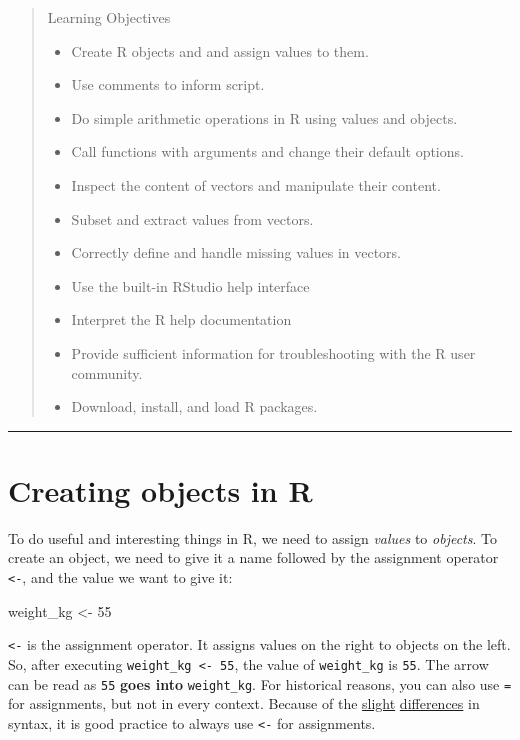 \documentclass[]{book}
\newenvironment{Shaded}{\begin{snugshade}}{\end{snugshade}}
\newcommand{\DecValTok}[1]{\textcolor[rgb]{0.00,0.00,0.81}{#1}}
\newcommand{\StringTok}[1]{\textcolor[rgb]{0.31,0.60,0.02}{#1}}
\newcommand{\NormalTok}[1]{#1}
\providecommand{\tightlist}{%
  \setlength{\itemsep}{0pt}\setlength{\parskip}{0pt}}
\theoremstyle{definition}
\theoremstyle{definition}
\theoremstyle{definition}
\theoremstyle{remark}
\begin{document}
\begin{quote}
Learning Objectives

\begin{itemize}
\tightlist
\item
  Create R objects and and assign values to them.
\item
  Use comments to inform script.
\item
  Do simple arithmetic operations in R using values and objects.
\item
  Call functions with arguments and change their default options.
\item
  Inspect the content of vectors and manipulate their content.
\item
  Subset and extract values from vectors.
\item
  Correctly define and handle missing values in vectors.
\item
  Use the built-in RStudio help interface
\item
  Interpret the R help documentation
\item
  Provide sufficient information for troubleshooting with the R user
  community.
\item
  Download, install, and load R packages.
\end{itemize}
\end{quote}

\begin{center}\rule{0.5\linewidth}{\linethickness}\end{center}

\section{Creating objects in R}\label{creating-objects-in-r}

To do useful and interesting things in R, we need to assign
\emph{values} to \emph{objects}. To create an object, we need to give it
a name followed by the assignment operator \texttt{\textless{}-}, and
the value we want to give it:

\begin{Shaded}
\begin{Highlighting}[]
\NormalTok{weight_kg <-}\StringTok{ }\DecValTok{55}
\end{Highlighting}
\end{Shaded}

\texttt{\textless{}-} is the assignment operator. It assigns values on
the right to objects on the left. So, after executing
\texttt{weight\_kg\ \textless{}-\ 55}, the value of \texttt{weight\_kg}
is \texttt{55}. The arrow can be read as \texttt{55} \textbf{goes into}
\texttt{weight\_kg}. For historical reasons, you can also use \texttt{=}
for assignments, but not in every context. Because of the
\href{http://blog.revolutionanalytics.com/2008/12/use-equals-or-arrow-for-assignment.html}{slight}
\href{https://web.archive.org/web/20130610005305/https://stat.ethz.ch/pipermail/r-help/2009-March/191462.html}{differences}
in syntax, it is good practice to always use \texttt{\textless{}-} for
assignments.
\end{document}
